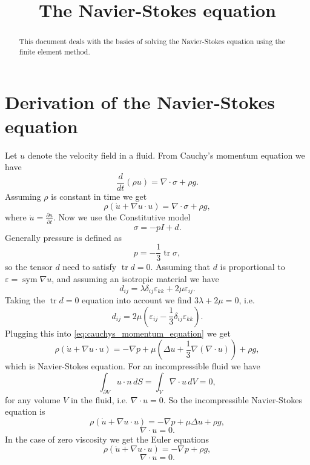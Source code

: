 \documentclass[a4paper,10pt]{article}
\DeclareMathOperator{\tr}{tr}
\DeclareMathOperator{\sym}{sym}
\begin{document}
\title{The Navier-Stokes equation}
\maketitle

\begin{abstract}
\noindent
This document deals with the basics of solving the Navier-Stokes equation using
the finite element method.
\end{abstract}

\section{Derivation of the Navier-Stokes equation}
Let $u$ denote the velocity field in a fluid. From Cauchy's momentum equation we
have
\[
\frac{d}{dt} (\rho u) = \nabla \cdot \sigma + \rho g.
\]
Assuming $\rho$ is constant in time we get
\begin{equation} \label{eq:cauchys_momentum_equation}
\rho (\dot{u} + \nabla u \cdot u) = \nabla \cdot \sigma + \rho g,
\end{equation}
where $\dot{u} = \frac{\partial u}{\partial t}$. Now we use the Constitutive
model
\[
\sigma = -p I + d.
\]
Generally pressure is defined as
\[
p = -\frac{1}{3} \tr \sigma,
\]
so the tensor $d$ need to satisfy $\tr d = 0$. Assuming that $d$ is proportional
to $\varepsilon = \sym \nabla u$, and assuming an isotropic material we have
\[
d_{ij} = \lambda \delta_{ij} \varepsilon_{kk} + 2 \mu \varepsilon_{ij}.  
\]
Taking the $\tr d = 0$ equation into account we find $3 \lambda + 2 \mu = 0$,
i.e.
\[
d_{ij} = 2 \mu \left( \varepsilon_{ij} - \frac{1}{3} \delta_{ij} \varepsilon_{kk} \right).
\]
Plugging this into \eqref{eq:cauchys_momentum_equation} we get
\[
\rho (\dot{u} + \nabla u \cdot u) 
= -\nabla p 
+ \mu \left( \Delta u + \frac{1}{3} \nabla (\nabla \cdot u) \right) 
+ \rho g,
\]
which is Navier-Stokes equation. For an incompressible fluid we have
\[
\int_{\partial V} u \cdot n \, dS = \int_V \nabla \cdot u \, dV = 0,
\]
for any volume $V$ in the fluid, i.e. $\nabla \cdot u = 0$. So the
incompressible Navier-Stokes equation is
\[
\rho (\dot{u} + \nabla u \cdot u) 
= -\nabla p 
+ \mu \Delta u
+ \rho g,
\]
\[
\nabla \cdot u = 0.
\]
In the case of zero viscosity we get the Euler equations
\[
\rho (\dot{u} + \nabla u \cdot u) 
= -\nabla p 
+ \rho g,
\]
\[
\nabla \cdot u = 0.
\]
\end{document}
